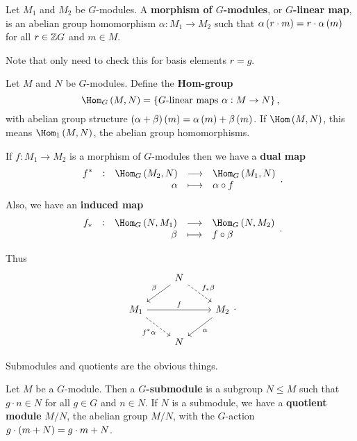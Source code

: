 \begin{definition}
Let $ M_1 $ and $ M_2 $ be $ G $-modules. A \textbf{morphism of $ G $-modules}, or \textbf{$ G $-linear map}, is an abelian group homomorphism $ \alpha : M_1 \to M_2 $ such that $ \alpha\br{r \cdot m} = r \cdot \alpha\br{m} $ for all $ r \in \mathbb{Z} G $ and $ m \in M $.
\end{definition}

Note that only need to check this for basis elements $ r = g $.

\begin{definition}
Let $ M $ and $ N $ be $ G $-modules. Define the \textbf{Hom-group}
$$ \Hom_G\br{M, N} = \cbr{\text{$ G $-linear maps} \ \alpha : M \to N}, $$
with abelian group structure $ \br{\alpha + \beta}\br{m} = \alpha\br{m} + \beta\br{m} $. If $ \Hom\br{M, N} $, this means $ \Hom_1\br{M, N} $, the abelian group homomorphisms.
\end{definition}

\begin{definition}
If $ f : M_1 \to M_2 $ is a morphism of $ G $-modules then we have a \textbf{dual map}
$$ \function[f^*]{\Hom_G\br{M_2, N}}{\Hom_G\br{M_1, N}}{\alpha}{\alpha \circ f}. $$
Also, we have an \textbf{induced map}
$$ \function[f_*]{\Hom_G\br{N, M_1}}{\Hom_G\br{N, M_2}}{\beta}{f \circ \beta}. $$
\end{definition}

Thus
$$
\begin{tikzcd}
& N \arrow{dl}[swap]{\beta} \arrow[dashed]{dr}{f_*\beta} & \\
M_1 \arrow{rr}{f} \arrow[dashed]{dr}[swap]{f^*\alpha} & & M_2 \arrow{dl}{\alpha} \\
& N &
\end{tikzcd}.
$$

\pagebreak

Submodules and quotients are the obvious things.

\begin{definition}
Let $ M $ be a $ G $-module. Then a \textbf{$ G $-submodule} is a subgroup $ N \le M $ such that $ g \cdot n \in N $ for all $ g \in G $ and $ n \in N $. If $ N $ is a submodule, we have a \textbf{quotient module} $ M / N $, the abelian group $ M / N $, with the $ G $-action $ g \cdot \br{m + N} = g \cdot m + N $.
\end{definition}

